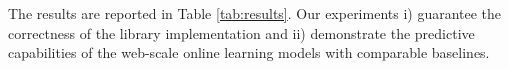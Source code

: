 \documentclass[letterpaper]{article} %
\begin{document}
The results are reported in Table \ref{tab:results}. Our experiments i) guarantee the correctness of the library implementation and ii) demonstrate the predictive capabilities of the web-scale online learning models with comparable baselines.



\end{document}
